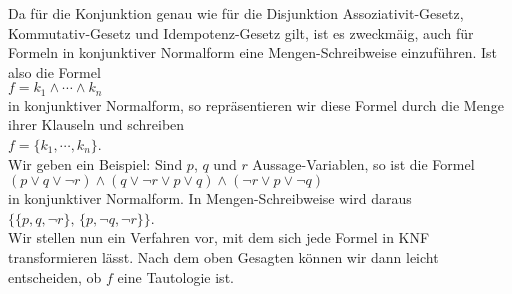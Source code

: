 Da f\"{u}r die Konjunktion genau wie f\"{u}r die Disjunktion Assoziativit-Gesetz, Kommutativ-Gesetz und
Idempotenz-Gesetz gilt, ist es zweckm\"{a}\3ig, auch f\"{u}r Formeln in konjunktiver Normalform eine
Mengen-Schreibweise einzuf\"{u}hren.  Ist also die Formel
\\[0.2cm]
\hspace*{1.3cm} $f = k_1 \wedge \cdots \wedge k_n$
\\[0.2cm]
in konjunktiver Normalform, so repr\"{a}sentieren wir diese
Formel  durch die Menge ihrer Klauseln und schreiben \\[0.2cm]
\hspace*{1.3cm} $f = \{ k_1, \cdots, k_n \}$. 
\\[0.2cm]
Wir geben ein Beispiel:  Sind $p$, $q$ und $r$ Aussage-Variablen, so ist die Formel
\\[0.2cm]
\hspace*{1.3cm}
$(p \vee q \vee \neg r) \wedge (q \vee \neg r \vee p \vee q)\wedge (\neg r \vee p \vee \neg q)$
\\[0.2cm]
in konjunktiver Normalform.  In Mengen-Schreibweise wird daraus
\\[0.2cm]
\hspace*{1.3cm}
$\bigl\{ \{p, q, \neg r \},\, \{ p, \neg q, \neg r \} \bigr\}$.
\\[0.2cm]
Wir stellen nun ein Verfahren vor, mit dem sich jede Formel in KNF transformieren l\"{a}sst.  Nach
dem oben Gesagten k\"{o}nnen wir dann leicht entscheiden, ob $f$ eine Tautologie ist.
